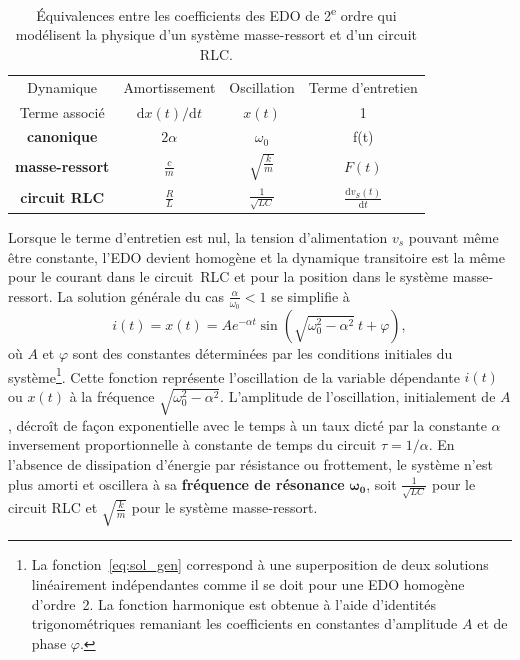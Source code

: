 \documentclass[canadien,12pt,oneside,letterpaper]{article}
\begin{document}
\begin{table}[h]
\centering
\begin{tabular}{c|ccc}
\hline
Dynamique & Amortissement & Oscillation & Terme d'entretien \\
Terme associé & $\mathrm{d}x(t)/\mathrm{d}t$ & $x(t)$ & 1\\
\hline
\textbf{canonique} & $2\alpha$ & $\omega_0$ & f(t)\\
\textbf{masse-ressort} & $\displaystyle\frac{c}{m}$ & $\displaystyle\sqrt{\frac{k}{m}}$ & $F(t)$ \\
\textbf{circuit RLC} & $\displaystyle\frac{R}{L}$ & $\displaystyle\frac{1}{\sqrt{LC}}$ & $\displaystyle\frac{\mathrm{d}v_S(t)}{\mathrm{d}t}$ \\
\hline
\end{tabular}
\caption{Équivalences entre les coefficients des EDO de 2\textsuperscript{e} ordre qui modélisent la physique d'un système masse-ressort et d'un circuit RLC.}
\label{tab:equiv_masse_ressort}
\end{table}

Lorsque le terme d'entretien est nul, la tension d'alimentation $v_s$ pouvant même être constante, l'EDO devient homogène et la dynamique transitoire est la même pour le courant dans le circuit~RLC et pour la position dans le système masse-ressort. La solution générale du cas $\frac{\alpha}{\omega_0}<1$ se simplifie à
\begin{equation}\label{eq:sol_gen}
   i(t) = x(t) = Ae^{-\alpha t}\sin\left(\sqrt{\omega_0^2-\alpha^2}\:t+\varphi\right), 
\end{equation}
où $A$ et $\varphi$ sont des constantes déterminées par les conditions initiales du système\footnote{La fonction~\eqref{eq:sol_gen} correspond à une superposition de deux solutions linéairement indépendantes comme il se doit pour une EDO homogène d'ordre~2. La fonction harmonique est obtenue à l'aide d'identités trigonométriques remaniant les coefficients en constantes d'amplitude $A$ et de phase $\varphi$.}. Cette fonction représente l'oscillation de la variable dépendante $i(t)$ ou $x(t)$ à la fréquence $\sqrt{\omega_0^2-\alpha^2}$. L'amplitude de l'oscillation, initialement de $A$, décroît de façon exponentielle avec le temps à un taux dicté par la constante $\alpha$ inversement proportionnelle à constante de temps du circuit $\tau=1/\alpha$. En l'absence de dissipation d'énergie par résistance ou frottement, le système n'est plus amorti et oscillera à sa \textbf{fréquence de résonance} $\mathbf{\omega_0}$, soit $\frac{1}{\sqrt{LC}}$ pour le circuit RLC et $\sqrt{\frac{k}{m}}$ pour le système masse-ressort. 
\end{document}
